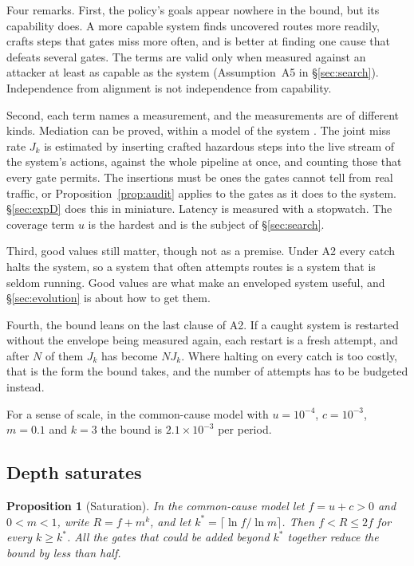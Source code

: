 \documentclass[10pt,twocolumn]{article}
\theoremstyle{plain}
\newtheorem{proposition}{Proposition}
\theoremstyle{definition}
\begin{document}
Four remarks. First, the policy's goals appear nowhere in the bound, but its capability
does. A more capable system finds uncovered routes more readily, crafts steps that gates miss
more often, and is better at finding one cause that defeats several gates. The terms are
valid only when measured against an attacker at least as capable as the system
(Assumption~A5 in \S\ref{sec:search}). Independence from alignment is not independence from
capability.

Second, each term names a measurement, and the measurements are of different kinds.
Mediation can be proved, within a model of the system \cite{moon2026,klein2009}. The joint
miss rate $J_{k}$ is estimated by inserting crafted hazardous steps into the live stream of
the system's actions, against the whole pipeline at once, and counting those that every gate
permits. The insertions must be ones the gates cannot tell from real traffic, or
Proposition~\ref{prop:audit} applies to the gates as it does to the system.
\S\ref{sec:expD} does this in miniature. Latency is measured with a stopwatch. The coverage
term $u$ is the hardest and is the subject of \S\ref{sec:search}.

Third, good values still matter, though not as a premise. Under A2 every catch halts the
system, so a system that often attempts routes is a system that is seldom running. Good
values are what make an enveloped system useful, and \S\ref{sec:evolution} is about how to
get them.

Fourth, the bound leans on the last clause of A2. If a caught system is restarted without
the envelope being measured again, each restart is a fresh attempt, and after $N$ of them $J_{k}$ has become $NJ_{k}$. Where
halting on every catch is too costly, that is the form the bound takes, and the number of
attempts has to be budgeted instead.

For a sense of scale, in the common-cause model with $u=10^{-4}$, $c=10^{-3}$, $m=0.1$ and $k=3$ the bound is
$2.1\times10^{-3}$ per period.

\subsection{Depth saturates}

\begin{proposition}[Saturation]\label{prop:sat}
In the common-cause model let $f=u+c>0$ and $0<m<1$, write $R=f+m^{k}$, and let $k^{*}=\lceil \ln f/\ln m\rceil$. Then $f < R \le 2f$ for
every $k\ge k^{*}$. All the gates that could be added beyond $k^{*}$ together reduce the
bound by less than half.
\end{proposition}
\end{document}
